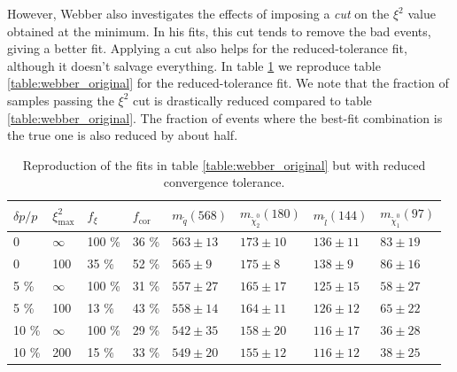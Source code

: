 \documentclass[twoside,english]{uiofysmaster}
\begin{document}
However, Webber also investigates the effects of imposing a {\it cut} on the $\xi^2$ value obtained at the minimum. In his fits, this cut tends to remove the bad events, giving a better fit. Applying a cut also helps for the reduced-tolerance fit, although it doesn't salvage everything. In table \ref{table:webber_rec_lowtol} we reproduce table \ref{table:webber_original} for the reduced-tolerance fit. We note that the fraction of samples passing the $\xi^2$ cut is drastically reduced compared to table \ref{table:webber_original}. The fraction of events where the best-fit combination is the true one is also reduced by about half. 


\begin{table}[hbt]
	\centering
	\begin{tabular}{| l | l | l | l  || l | l | l | l |}
		\hline
		$\delta p/p$ & $\xi^2_\mathrm{max}$ & $f_\xi$ & $f_\mathrm{cor}$ & $m_{\tilde q} (568)$ & $m_{\tilde \chi_2^0} (180)$ & $m_{\tilde l} (144)$ & $m_{\tilde \chi_1^0} (97)$ \\
		\hline \hline
		0 & 	$\infty$ &	100 \%	& 36 \%	& $563 \pm 13$	&	$173 \pm 10$	&	$136 \pm 11$	& 	$83 \pm 19$	\\
		0 &		100 &		35 \%	& 52 \% & $565 \pm 9$	&	$175 \pm 8$		&	$138 \pm 9$	&	$86 \pm 16$	\\
		5 \% &	$\infty$ &	100 \%	& 31 \% & $557 \pm 27$	& 	$165 \pm 17$	&	$125 \pm 15$&	$58 \pm 27$ \\
		5 \% &	100 &		13 \%	& 43 \% & $558 \pm 14$	&	$164 \pm 11$	& 	$126 \pm 12$	&	$65 \pm 22$	\\
		10 \% &	$\infty$ &	100 \%	& 29 \% & $542 \pm 35$	&	$158 \pm 20$	&	$116 \pm 17$&	$36 \pm 28$	\\
		10 \% &	200 &		15 \%	& 33 \% & $549 \pm 20$	& 	$155 \pm 12$	&	$116 \pm 12$&	$38 \pm 25$ \\
		\hline
	\end{tabular}
	\caption{Reproduction of the fits in table \ref{table:webber_original} but with reduced convergence tolerance.}
	\label{table:webber_rec_lowtol}
\end{table}


\end{document}
